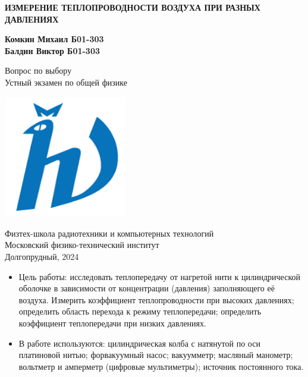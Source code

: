 \documentclass[12pt]{article}
\begin{document}
    \begin{titlepage}
        \begin{center}
            \vspace*{1cm}

            \Huge
            \textbf{ИЗМЕРЕНИЕ ТЕПЛОПРОВОДНОСТИ ВОЗДУХА ПРИ РАЗНЫХ ДАВЛЕНИЯХ}

            \vspace{1.5cm}

            \Large
            \textbf{Комкин Михаил Б01-303\\
                    Балдин Виктор Б01-303}

            \vfill

            Вопрос по выбору \\
            Устный экзамен по общей физике

            \vspace{0.8cm}

            \includegraphics[width=0.4\textwidth]{university_logo.png}

            Физтех-школа радиотехники и компьютерных технологий\\
            Московский физико-технический институт\\
            Долгопрудный, 2024
        \end{center}
    \end{titlepage}

    \begin{itemize}
        \item{Цель работы:} исследовать теплопередачу от нагретой нити к цилиндрической оболочке в зависимости от концентрации
        (давления) заполняющего её воздуха. Измерить коэффициент теплопроводности при высоких давлениях; определить область перехода к
        режиму теплопередачи; определить коэффициент теплопередачи при низких давлениях.\\
        \item{В работе используются:} цилиндрическая колба с натянутой по оси платиновой нитью; форвакуумный насос; вакуумметр; масляный манометр; вольтметр и амперметр
        (цифровые мультиметры); источник постоянного тока.
    \end{itemize}
\end{document}
